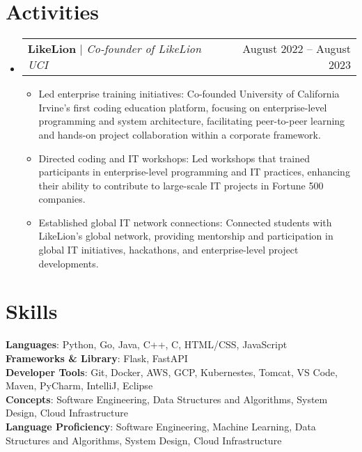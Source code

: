 \documentclass[letterpaper,11pt]{article}
\makeatletter
\newcommand{\resumeItem}[1]{
  \item\small{
    {#1 \vspace{-2pt}}
  }
}
\newcommand{\resumeActivitiesHeading}[2]{
    \item
    \begin{tabular*}{0.97\textwidth}{l@{\extracolsep{\fill}}r}
      \small#1 & #2 \\
    \end{tabular*}\vspace{-7pt}
}
\newcommand{\resumeSubHeadingListStart}{\begin{itemize}[leftmargin=0.15in, label={}]}
\newcommand{\resumeSubHeadingListEnd}{\end{itemize}}
\newcommand{\resumeItemListStart}{\begin{itemize}}
\newcommand{\resumeItemListEnd}{\end{itemize}\vspace{-5pt}}
\makeatother
\begin{document}
%

\section{Activities}
    \resumeSubHeadingListStart
      \resumeActivitiesHeading
          {\textbf{LikeLion} $|$ \emph{Co-founder of LikeLion UCI}}{August 2022 -- August 2023}
          \resumeItemListStart
            \resumeItem{Led enterprise training initiatives: Co-founded University of California Irvine’s first coding education platform, focusing on enterprise-level programming and system architecture, facilitating peer-to-peer learning and hands-on project collaboration within a corporate framework.}
            \resumeItem{Directed coding and IT workshops: Led workshops that trained participants in enterprise-level programming and IT practices, enhancing their ability to contribute to large-scale IT projects in Fortune 500 companies.}
            \resumeItem{Established global IT network connections: Connected students with LikeLion's global network, providing mentorship and participation in global IT initiatives, hackathons, and enterprise-level project developments.}
          \resumeItemListEnd
    \resumeSubHeadingListEnd

%

\section{Skills}
 \begin{itemize}[leftmargin=0.15in, label={}]
    \small{\item{
     \textbf{Languages}{: Python, Go, Java, C++, C, HTML/CSS, JavaScript} \\
     \textbf{Frameworks \& Library}{: Flask, FastAPI} \\
     \textbf{Developer Tools}{: Git, Docker, AWS, GCP, Kubernestes, Tomcat, VS Code, Maven, PyCharm, IntelliJ, Eclipse} \\
     \textbf{Concepts}{: Software Engineering, Data Structures and Algorithms, System Design, Cloud Infrastructure}\\
     \textbf{Language Proficiency}{: Software Engineering, Machine Learning, Data Structures and Algorithms, System Design, Cloud Infrastructure}

    }}
 \end{itemize}


\end{document}
